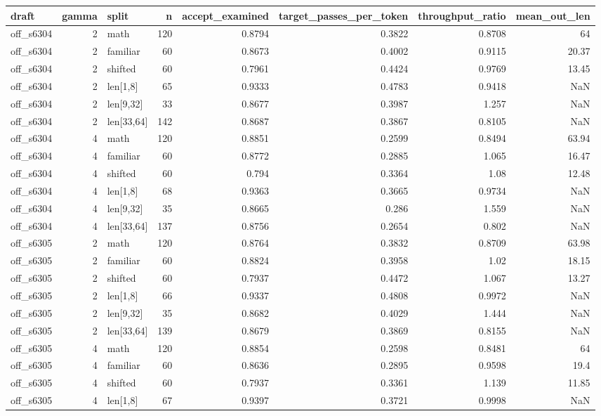 \begin{table}
\label{tab:task3_spec_workload}
\begin{tabular}{lrlrrrrr}
\toprule
draft & gamma & split & n & accept\_examined & target\_passes\_per\_token & throughput\_ratio & mean\_out\_len \\
\midrule
off\_s6304 & 2 & math & 120 & 0.8794 & 0.3822 & 0.8708 & 64 \\
off\_s6304 & 2 & familiar & 60 & 0.8673 & 0.4002 & 0.9115 & 20.37 \\
off\_s6304 & 2 & shifted & 60 & 0.7961 & 0.4424 & 0.9769 & 13.45 \\
off\_s6304 & 2 & len[1,8] & 65 & 0.9333 & 0.4783 & 0.9418 & NaN \\
off\_s6304 & 2 & len[9,32] & 33 & 0.8677 & 0.3987 & 1.257 & NaN \\
off\_s6304 & 2 & len[33,64] & 142 & 0.8687 & 0.3867 & 0.8105 & NaN \\
off\_s6304 & 4 & math & 120 & 0.8851 & 0.2599 & 0.8494 & 63.94 \\
off\_s6304 & 4 & familiar & 60 & 0.8772 & 0.2885 & 1.065 & 16.47 \\
off\_s6304 & 4 & shifted & 60 & 0.794 & 0.3364 & 1.08 & 12.48 \\
off\_s6304 & 4 & len[1,8] & 68 & 0.9363 & 0.3665 & 0.9734 & NaN \\
off\_s6304 & 4 & len[9,32] & 35 & 0.8665 & 0.286 & 1.559 & NaN \\
off\_s6304 & 4 & len[33,64] & 137 & 0.8756 & 0.2654 & 0.802 & NaN \\
off\_s6305 & 2 & math & 120 & 0.8764 & 0.3832 & 0.8709 & 63.98 \\
off\_s6305 & 2 & familiar & 60 & 0.8824 & 0.3958 & 1.02 & 18.15 \\
off\_s6305 & 2 & shifted & 60 & 0.7937 & 0.4472 & 1.067 & 13.27 \\
off\_s6305 & 2 & len[1,8] & 66 & 0.9337 & 0.4808 & 0.9972 & NaN \\
off\_s6305 & 2 & len[9,32] & 35 & 0.8682 & 0.4029 & 1.444 & NaN \\
off\_s6305 & 2 & len[33,64] & 139 & 0.8679 & 0.3869 & 0.8155 & NaN \\
off\_s6305 & 4 & math & 120 & 0.8854 & 0.2598 & 0.8481 & 64 \\
off\_s6305 & 4 & familiar & 60 & 0.8636 & 0.2895 & 0.9598 & 19.4 \\
off\_s6305 & 4 & shifted & 60 & 0.7937 & 0.3361 & 1.139 & 11.85 \\
off\_s6305 & 4 & len[1,8] & 67 & 0.9397 & 0.3721 & 0.9998 & NaN \\

\end{tabular}
\end{table}

